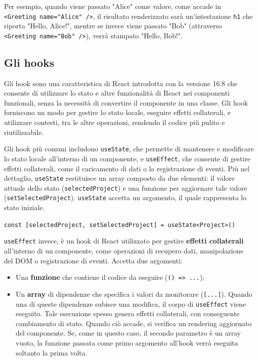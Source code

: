 \documentclass[target=bach,aauheader=,style=]{thud}
\begin{document}
\noindent Per esempio, quando viene passato "Alice" come valore, come accade in \texttt{<Greeting name="Alice" />}, il risultato renderizzato sarà un'intestazione \texttt{h1} che riporta "Hello, Alice!", mentre se invece viene passato "Bob" (attraverso \texttt{<Greeting name="Bob" />}), verrà stampato "Hello, Bob!".

\subsection{Gli hooks}
Gli hook sono una caratteristica di React introdotta con la versione 16.8 che consente di utilizzare lo stato e altre funzionalità di React nei componenti funzionali, senza la necessità di convertire il componente in una classe. Gli hook forniscono un modo per gestire lo stato locale, eseguire effetti collaterali, e utilizzare contesti, tra le altre operazioni, rendendo il codice più pulito e riutilizzabile. 

\noindent Gli hook più comuni includono \texttt{useState}, che permette di mantenere e modificare lo stato locale all'interno di un componente, e \texttt{useEffect}, che consente di gestire effetti collaterali, come il caricamento di dati o la registrazione di eventi. Più nel dettaglio, \texttt{useState} restituisce un array composto da due elementi: il valore attuale dello stato (\texttt{selectedProject}) e una funzione per aggiornare tale valore (\texttt{setSelectedProject}). \texttt{useState} accetta un argomento, il quale rappresenta lo stato iniziale.

\begin{center}
\texttt{const [selectedProject, setSelectedProject] = useState<Project>({})}
\end{center}

\noindent \texttt{useEffect} invece, è un hook di React utilizzato per gestire \textbf{effetti collaterali} all'interno di un componente, come operazioni di recupero dati, manipolazione del DOM o registrazione di eventi. Accetta due argomenti: 

\begin{itemize}
    \item Una \textbf{funzione} che contiene il codice da eseguire (\texttt{() => {...}});
    \item Un \textbf{array} di dipendenze che specifica i valori da monitorare (\texttt{[...]}). Quando una di queste dipendenze subisce una modifica, il corpo di \texttt{useEffect} viene eseguito. Tale esecuzione spesso genera effetti collaterali, con conseguente cambiamento di stato. Quando ciò accade, si verifica un rendering aggiornato del componente. Se, come in questo caso, il secondo parametro è un array vuoto, la funzione passata come primo argomento all'hook verrà eseguita soltanto la prima volta.
\end{itemize}
\end{document}
